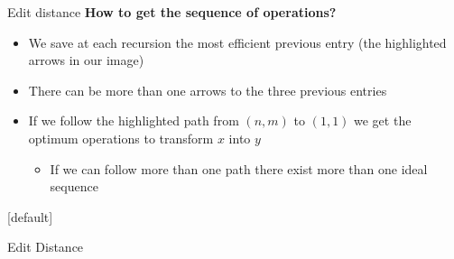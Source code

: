 \begin{frame}{Edit distance}
  \textbf{How to get the sequence of operations?}
  \begin{itemize}
    \item<2->
      We save at each recursion the most efficient previous entry
      (the {\color{Mittel-Blau}highlighted arrows} in our image)
    \item<3->
      There can be {\color{Mittel-Blau}more than one} arrows to the three
      previous entries
    \item<4->
      If we follow the highlighted path from {\color{Mittel-Blau}$(n, m)$} to
      {\color{Mittel-Blau}$(1, 1)$} we get the optimum operations to transform
      {\color{Mittel-Blau}$x$} into {\color{Mittel-Blau}$y$}
      \begin{itemize}
        \item<5->
          If we can follow {\color{Mittel-Blau}more than one path} there exist
          more than one ideal {\color{Mittel-Blau}sequence}
      \end{itemize}
  \end{itemize}
\end{frame}


{%
  [default]
  \makeatletter\def\beamer@entrycode{\vspace*{-\headheight}}\makeatother
  \begin{frame}{Edit Distance}
    \begin{center}
      \begin{adjustbox}{width=0.8\linewidth}
        \def\AlgoIntro{0}\def\AlgoFinal{1}%
        
      \end{adjustbox}
    \end{center}
  \end{frame}
}%


